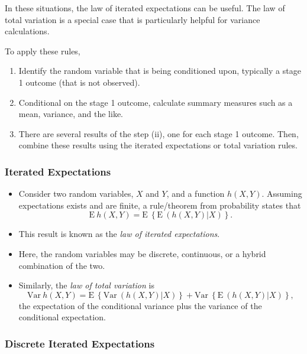 \documentclass[]{book}
\theoremstyle{definition}
\theoremstyle{definition}
\theoremstyle{definition}
\theoremstyle{remark}
\begin{document}
In these situations, the law of iterated expectations can be useful. The
law of total variation is a special case that is particularly helpful
for variance calculations.

To apply these rules,

\begin{enumerate}
\def\labelenumi{\arabic{enumi}.}
\item
  Identify the random variable that is being conditioned upon, typically
  a stage 1 outcome (that is not observed).
\item
  Conditional on the stage 1 outcome, calculate summary measures such as
  a mean, variance, and the like.
\item
  There are several results of the step (ii), one for each stage 1
  outcome. Then, combine these results using the iterated expectations
  or total variation rules.
\end{enumerate}

\subsubsection{Iterated Expectations}\label{iterated-expectations-1}

\begin{itemize}
\item
  Consider two random variables, \(X\) and \(Y\), and a function
  \(h(X,Y)\). Assuming expectations exists and are finite, a
  rule/theorem from probability states that
  \[\mathrm{E~} h(X,Y)= \mathrm{E~} \left\{ \mathrm{E~} \left( h(X,Y) | X \right) \right \} .\]
\item
  This result is known as the \emph{law of iterated expectations}.
\item
  Here, the random variables may be discrete, continuous, or a hybrid
  combination of the two.
\item
  Similarly, the \emph{law of total variation} is
  \[\mathrm{Var~} h(X,Y)= \mathrm{E~} \left\{ \mathrm{Var~} \left( h(X,Y) | X \right) \right \}
  +\mathrm{Var~} \left\{ \mathrm{E~} \left( h(X,Y) | X \right) \right \},\]
  the expectation of the conditional variance plus the variance of the
  conditional expectation.
\end{itemize}

\subsubsection{Discrete Iterated
Expectations}\label{discrete-iterated-expectations}
\end{document}
